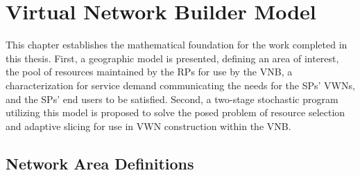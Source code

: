 \documentclass[12pt,dvipsnames]{report}
\begin{document}
\iftrue
\pagebreak
\chapter{Virtual Network Builder Model} \label{ch:vnbmodel}

%
This chapter establishes the mathematical foundation for the work completed in this thesis.  First, a geographic model is presented, defining an area of interest, the pool of resources maintained by the RPs for use by the VNB, a characterization for service demand communicating the needs for the SPs' VWNs, and the SPs' end users to be satisfied.  Second, a two-stage stochastic program utilizing this model is proposed to solve the posed problem of resource selection and adaptive slicing for use in VWN construction within the VNB.



\section{Network Area Definitions} \label{sec:networkdefs}
\end{document}
